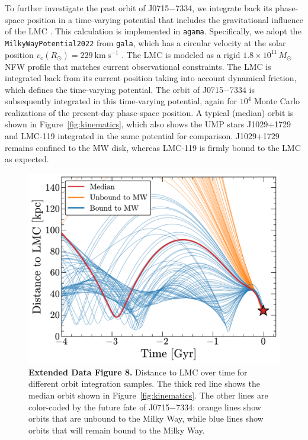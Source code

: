 \documentclass{natureprintstyle}
\newcommand{\umpstar}{J0715$-$7334\xspace}
\newcommand{\caffaustar}{J1029$+$1729\xspace}
\begin{document}
To further investigate the past orbit of \umpstar, we integrate back its phase-space position in a time-varying potential that includes the gravitational influence of the LMC \cite{Patel2020, Chandra2023b}. 
This calculation is implemented in \texttt{agama}\cite{Vasiliev2019}. 
Specifically, we adopt the \texttt{MilkyWayPotential2022} from \texttt{gala}\cite{gala}, which has a circular velocity at the solar position $v_\mathrm{c}(R_\odot) = 229~\textrm{km}~\textrm{s}^{-1}$ \cite{Eilers2019}. 
The LMC is modeled as a rigid $1.8 \times 10^{11}\,M_\odot$ NFW profile that matches current observational constraints\cite{Vasiliev2021a}. 
The LMC is integrated back from its current position taking into account dynamical friction, which defines the time-varying potential\cite{VanDerMarel2002, Pietrzynski2019, Luri2021}. 
The orbit of \umpstar is subsequently integrated in this time-varying potential, again for $10^4$ Monte Carlo realizations of the present-day phase-space position. 
A typical (median) orbit is shown in Figure~\ref{fig:kinematics}, which also shows the UMP stars \caffaustar{} and LMC-119 integrated in the same potential for comparison. 
\caffaustar{} remains confined to the MW disk, whereas LMC-119 is firmly bound to the LMC as expected.

\begin{figure}
    \centering
    \includegraphics[width=\linewidth]{lmc_dist_samples.pdf}
    \caption{\textbf{Extended Data Figure 8.} 
    Distance to LMC over time for different orbit integration samples.
    The thick red line shows the median orbit shown in Figure~\ref{fig:kinematics}. The other lines are color-coded by the future fate of \umpstar: orange lines show orbits that are unbound to the Milky Way, while blue lines show orbits that will remain bound to the Milky Way.}
    \label{fig:lmcdistsamples}
\end{figure}
\end{document}
